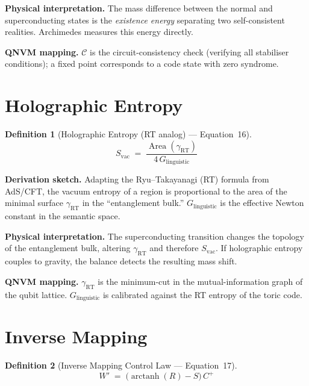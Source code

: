 \documentclass[11pt,a4paper]{article}
\newtheorem{definition}{Definition}[section]
\theoremstyle{remark}
\DeclareMathOperator{\arctanh}{arctanh}
\DeclareMathOperator{\Area}{Area}
\newcommand{\CalC}{\mathcal{C}}
\begin{document}
\textbf{Physical interpretation.}\quad
The mass difference between the normal and superconducting states is the \emph{existence energy} separating two self-consistent realities.  Archimedes measures this energy directly.

\textbf{QNVM mapping.}\quad
$\CalC$ is the circuit-consistency check (verifying all stabiliser conditions); a fixed point corresponds to a code state with zero syndrome.

\section{Holographic Entropy}
\label{sec:eq16}

\begin{definition}[Holographic Entropy (RT analog) --- Equation~16]
\begin{equation}\label{eq:holo}
    S_{\text{vac}} \;=\; \frac{\Area(\gamma_{\text{RT}})}{4\,G_{\text{linguistic}}}
\end{equation}
\end{definition}

\textbf{Derivation sketch.}\quad
Adapting the Ryu--Takayanagi (RT) formula from AdS/CFT, the vacuum entropy of a region is proportional to the area of the minimal surface $\gamma_{\text{RT}}$ in the ``entanglement bulk.''  $G_{\text{linguistic}}$ is the effective Newton constant in the semantic space.

\textbf{Physical interpretation.}\quad
The superconducting transition changes the topology of the entanglement bulk, altering $\gamma_{\text{RT}}$ and therefore $S_{\text{vac}}$.  If holographic entropy couples to gravity, the balance detects the resulting mass shift.

\textbf{QNVM mapping.}\quad
$\gamma_{\text{RT}}$ is the minimum-cut in the mutual-information graph of the qubit lattice.  $G_{\text{linguistic}}$ is calibrated against the RT entropy of the toric code.

\section{Inverse Mapping}
\label{sec:eq17}

\begin{definition}[Inverse Mapping Control Law --- Equation~17]
\begin{equation}\label{eq:inverse}
    W' \;=\; \bigl(\arctanh(R) - S\bigr)\,C^{+}
\end{equation}
\end{definition}
\end{document}

